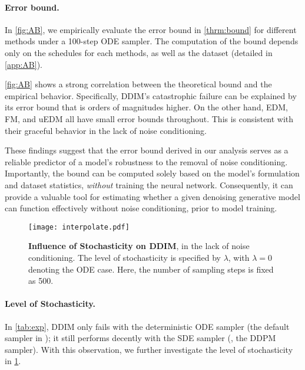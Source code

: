 \paragraph{Error bound.}\label{subsec:apply}
In \cref{fig:AB}, we empirically evaluate the error bound in \cref{thrm:bound} for different methods under a 100-step ODE sampler. The computation of the bound depends only on the schedules for each methods, as well as the dataset (detailed in \cref{app:AB}).

\cref{fig:AB} shows a strong correlation between the theoretical bound and the empirical behavior. Specifically, DDIM's catastrophic failure can be explained by its error bound that is orders of magnitudes higher. On the other hand, EDM, FM, and uEDM all have small error bounds throughout. This is consistent with their graceful behavior in the lack of noise conditioning.

These findings suggest that the error bound derived in our analysis serves as a reliable predictor of a model's robustness to the removal of noise conditioning. Importantly, the bound can be computed solely based on the model's formulation and dataset statistics, \textit{without} training the neural network. Consequently, it can provide a valuable tool for estimating whether a given denoising generative model can function effectively without noise conditioning, prior to model training.

\begin{figure}[t]
    \centering
    \vspace{-1em}
    \texttt{[image: interpolate.pdf]}
    \vspace{-1em}
    \caption{\textbf{Influence of Stochasticity on DDIM}, in the lack of noise conditioning. The level of stochasticity is specified by $\lambda$, with $\lambda=0$ denoting the ODE case. Here, the number of sampling steps is fixed as 500.
   }
    \label{fig:interpolate}
\end{figure}


\paragraph{Level of Stochasticity.}

In \cref{tab:exp}, DDIM only fails with the deterministic ODE sampler (the default sampler in \citep{song2021ddim}); it still performs decently with the SDE sampler (\ie, the DDPM sampler). With this observation, we further investigate the level of stochasticity in \cref{fig:interpolate}. 

